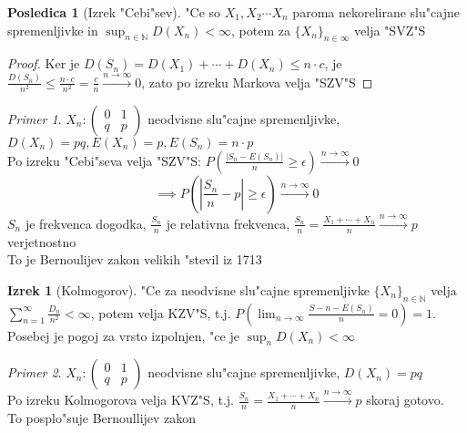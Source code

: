 \documentclass[a4paper,12pt]{article}
\theoremstyle{definition}
\newtheorem{conseq}[counter]{Posledica}
\newtheorem{theorem}[counter]{Izrek}
\theoremstyle{remark}
\newtheorem*{ex}{Primer}
\newcommand{\N}{\mathbb{N}}
\begin{document}
\begin{conseq}[Izrek "Cebi"sev]
    "Ce so $X_1, X_2 \cdots X_n$ paroma nekorelirane slu"cajne spremenljivke in $\sup_{n \in \N} D(X_n) < \infty$, potem
    za $\{X_n\}_{n \in \infty}$ velja "SVZ"S
\end{conseq}

\begin{proof}
    Ker je $D(S_n) = D(X_1) + \cdots + D(X_n) \leq n \cdot c$, je $\frac{D(S_n)}{n^2} \leq \frac{n \cdot c}{n^2}
    = \frac{c}{n} \stackrel{n \to \infty}{\rightarrow} 0$, zato po izreku Markova velja "SZV"S
\end{proof}

\begin{ex}
    $X_n: \begin{pmatrix}0 & 1 \\ q & p\end{pmatrix}$ neodvisne slu"cajne spremenljivke, $D(X_n) = pq, E(X_n) = p,
    E(S_n) = n \cdot p$ \\
    Po izreku "Cebi"seva velja "SZV"S: $P(\frac{|S_n - E(S_n)|}{n} \geq \epsilon) \stackrel{n \to \infty}{\rightarrow} 0$
    \[\implies P(|\frac{S_n}{n} - p| \geq \epsilon) \stackrel{n \to \infty}{\rightarrow} 0\]
    $S_n$ je frekvenca dogodka, $\frac{S_n}{n}$ je relativna frekvenca, $\frac{S_n}{n} = \frac{X_1 + \cdots + X_n}{n}
    \stackrel{n \to \infty}{\rightarrow} p$ verjetnostno \\
    To je Bernoulijev zakon velikih "stevil iz 1713
\end{ex}

\begin{theorem}[Kolmogorov]
    "Ce za neodvisne slu"cajne spremenljivke $\{X_n\}_{n \in \N}$ velja $\sum_{n=1}^{\infty} \frac{D_n}{n^2} < \infty$,
    potem velja KZV"S, t.j. $P(\lim_{n \to \infty} \frac{S-n - E(S_n)}{n} = 0) = 1$. \\
    Posebej je pogoj za vrsto izpolnjen, "ce je $\sup_n D(X_n) < \infty$ 
\end{theorem}

\begin{ex}
    $X_n: \begin{pmatrix}0 & 1 \\ q & p\end{pmatrix}$ neodvisne slu"cajne spremenljivke, $D(X_n) = pq$ \\
    Po izreku Kolmogorova velja KVZ"S, t.j. $\frac{S_n}{n} = \frac{X_1 + \cdots + X_n}{n}
    \stackrel{n \to \infty}{\rightarrow} p$ skoraj gotovo. \\
    To posplo"suje Bernoullijev zakon
\end{ex}
\end{document}
